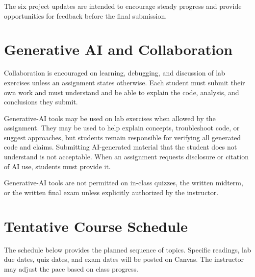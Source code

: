 \documentclass[11pt]{article}
\begin{document}
The six project updates are intended to encourage steady progress and provide opportunities for feedback before the final submission.

\section{Generative AI and Collaboration}

Collaboration is encouraged on learning, debugging, and discussion of lab exercises unless an assignment states otherwise. Each student must submit their own work and must understand and be able to explain the code, analysis, and conclusions they submit.

Generative-AI tools may be used on lab exercises when allowed by the assignment. They may be used to help explain concepts, troubleshoot code, or suggest approaches, but students remain responsible for verifying all generated code and claims. Submitting AI-generated material that the student does not understand is not acceptable. When an assignment requests disclosure or citation of AI use, students must provide it.

Generative-AI tools are not permitted on in-class quizzes, the written midterm, or the written final exam unless explicitly authorized by the instructor.

\section{Tentative Course Schedule}

The schedule below provides the planned sequence of topics. Specific readings, lab due dates, quiz dates, and exam dates will be posted on Canvas. The instructor may adjust the pace based on class progress.
\end{document}
